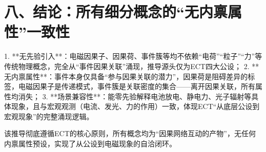 \documentclass{article}
\begin{document}
\section*{八、结论：所有细分概念的“无内禀属性”一致性}
1. **无先验引入**：电磁因果子、因果荷、事件簇等均不依赖“电荷”“粒子”“力”等传统物理概念，完全从“事件因果关联”涌现，推导源头仅为ECT四大公设；  
2. **无内禀属性**：事件本身仅具备“参与因果关联的潜力”，因果荷是阻碍差异的标签，电磁因果子是传递模式，事件簇是关联密度的集合——离开因果关联，所有属性均消失；  
3. **场景兼容性**：能零先验解释电池放电、静电力、光子辐射等具体现象，且与宏观观测（电流、发光、力的作用）一致，体现ECT“从底层公设到宏观现象”的完整涌现逻辑。

该推导彻底遵循ECT的核心原则，所有概念均为“因果网络互动的产物”，无任何内禀属性预设，实现了从公设到电磁现象的自洽闭环。
\end{document}
